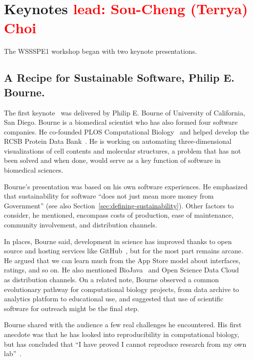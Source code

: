 \documentclass[11pt, oneside]{amsart}
\newcommand{\note}[1]{ {\textcolor{red}    { #1 }}}
\begin{document}
\section{Keynotes \note{lead: Sou-Cheng (Terrya) Choi}} \label{sec:keynotes}

The WSSSPE1 workshop began with two keynote presentations.

\subsection{A Recipe for Sustainable Software, Philip E. Bourne.} \label{sec:keynote1}

The first keynote~\cite{WSSSPE1-keynote1} was delivered by Philip
E. Bourne of University of California, San Diego.  Bourne is a
biomedical scientist who has also formed four software companies. He co-founded
PLOS Computational Biology~\cite{plos-web} and helped develop the RCSB
Protein Data Bank~\cite{pdb-web}.
He is working on automating three-dimensional visualizations of cell
contents and molecular structures, a problem that has not been solved
and when done, would serve as a key function of software in biomedical
sciences.

Bourne's  presentation was based on his own software experiences.  He emphasized that
sustainability for software ``does not just mean more money from
Government'' (see also Section~\ref{sec:defining-sustainability}).  Other
factors to consider, he mentioned, encompass costs of production, ease
of maintenance, community involvement, and distribution channels.

In places, Bourne said, development in science has improved thanks to
open source and hosting services like GitHub~\cite{github-web}, but for the most part
remains arcane. He argued that we can learn much from the App Store
model about interfaces, ratings, and so on. He also mentioned
BioJava~\cite{biojava-web} and Open Science Data Cloud~\cite{osdc-web}
as distribution channels.  On a related note, Bourne observed a common
evolutionary pathway for computational biology projects, from data
archive to analytics platform to educational use, and suggested that
use of scientific software for outreach might be the final step.

Bourne shared with the audience a few real challenges he
encountered. His first anecdote was that he has looked into
reproducibility in computational biology, but has concluded that ``I
have proved I cannot reproduce research from my own
lab''~\cite{Veretnik}.
\end{document}
